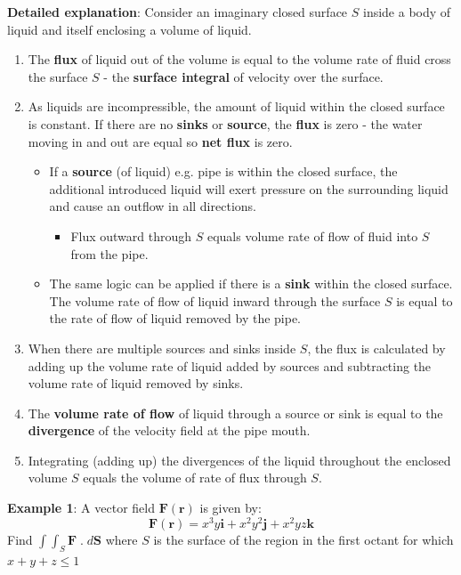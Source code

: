 \documentclass[10pt,a4paper]{article}
\begin{document}
\textbf{Detailed explanation}: Consider an imaginary closed surface $S$ inside a body of liquid and itself
enclosing a volume of liquid.
\begin{enumerate}
    \item The \textbf{flux} of liquid out of the volume is equal to the volume rate of fluid cross
    the surface $S$ - the \textbf{surface integral} of velocity over the surface. 

    \item As liquids are incompressible, the amount of liquid within the closed surface is constant.
    If there are no \textbf{sinks} or \textbf{source}, the \textbf{flux} is zero - the water moving
    in and out are equal so \textbf{net flux} is zero.
    \begin{itemize}
        \item If a \textbf{source} (of liquid) e.g. pipe is within the closed surface, the additional
        introduced liquid will exert pressure on the surrounding liquid and cause an outflow in all
        directions. 
        \begin{itemize}
            \item Flux outward through $S$ equals volume rate of flow of fluid into $S$ from the pipe.
        \end{itemize}
        
        \item The same logic can be applied if there is a \textbf{sink} within the closed surface. The
        volume rate of flow of liquid inward through the surface $S$ is equal to the rate of flow of
        liquid removed by the pipe.
    \end{itemize}

    \item When there are multiple sources and sinks inside $S$, the flux is calculated by adding up
    the volume rate of liquid added by sources and subtracting the volume rate of liquid removed by
    sinks.
    
    \item The \textbf{volume rate of flow} of liquid through a source or sink is equal to the
    \textbf{divergence} of the velocity field at the pipe mouth. 

    \item Integrating (adding up) the divergences of the liquid throughout the enclosed volume $S$
    equals the volume of rate of flux through $S$.
\end{enumerate}

\textbf{Example 1}: A vector field $\textbf{F}(\textbf{r})$ is given by:
$$
    \textbf{F}(\textbf{r}) = x^3y \textbf{i} + x^2y^2 \textbf{j} + x^2yz \textbf{k}
$$
Find $\int \int_S \textbf{F}\;.\;d\textbf{S}$ where $S$ is the surface of the region in the first
octant for which $x+y+z \leq 1$
\end{document}
